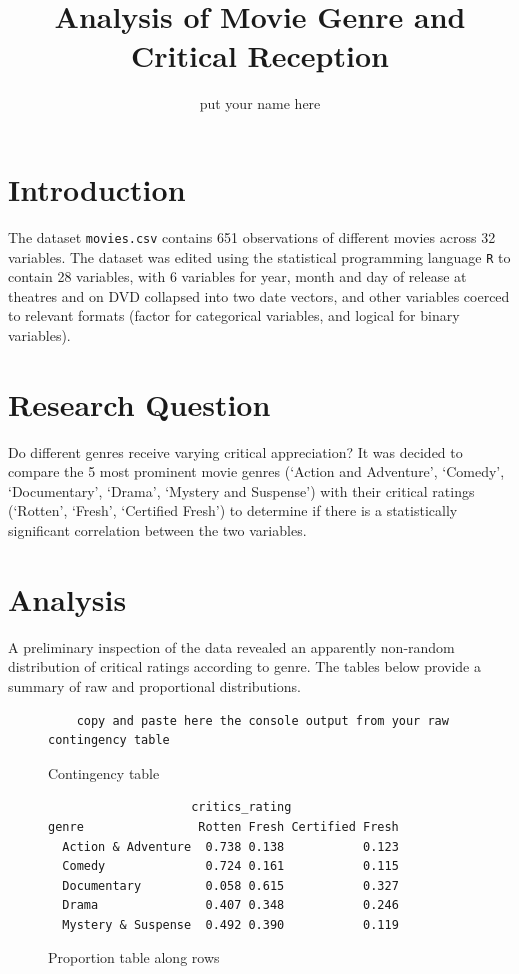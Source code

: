 \documentclass[12pt,a4paper]{article}
\author{put your name here}
\title{Analysis of Movie Genre and Critical Reception}
\begin{document}
	\maketitle
	
	\section*{Introduction}
	The dataset {\tt movies.csv} contains 651 observations of different movies across 32 variables. The dataset was edited using the statistical programming language {\tt R} to contain 28 variables, with 6 variables for year, month and day of release at theatres and on DVD collapsed into two date vectors, and other variables coerced to relevant formats (factor for categorical variables, and logical for binary variables). 
	
	\section*{Research Question}
	Do different genres receive varying critical appreciation? It was decided to compare the 5 most prominent movie genres (`Action and Adventure', `Comedy', `Documentary', `Drama', `Mystery and Suspense') with their critical ratings (`Rotten', `Fresh', `Certified Fresh') to determine if there is a statistically significant correlation between the two variables.
	
	\section*{Analysis}
	A preliminary inspection of the data revealed an apparently non-random distribution of critical ratings according to genre. The tables below provide a summary of raw and proportional distributions.
	\begin{figure}
			\begin{verbatim}
	copy and paste here the console output from your raw contingency table
			\end{verbatim}
		\caption{\footnotesize Contingency table}
	\end{figure}
	\begin{figure}
			\begin{verbatim}
                    critics_rating
genre                Rotten Fresh Certified Fresh
  Action & Adventure  0.738 0.138           0.123
  Comedy              0.724 0.161           0.115
  Documentary         0.058 0.615           0.327
  Drama               0.407 0.348           0.246
  Mystery & Suspense  0.492 0.390           0.119
			\end{verbatim}
		\caption{\footnotesize Proportion table along rows}
	\end{figure}
\end{document}
